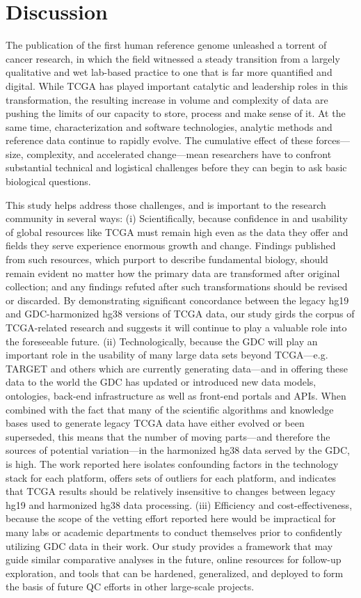 \section{Discussion}
The publication of the first human reference genome unleashed a torrent of cancer research, in which the field witnessed a steady transition from a largely qualitative and wet lab-based practice to one that is far more quantified and digital. While TCGA has played important catalytic and leadership roles in this transformation, the resulting increase in volume and complexity of data are pushing the limits of our capacity to store, process and make sense of it. At the same time, characterization and software technologies, analytic methods and reference data continue to rapidly evolve. The cumulative effect of these forces---size, complexity, and accelerated change---mean researchers have to confront substantial technical and logistical challenges before they can begin to ask basic biological questions.

This study helps address those challenges, and is important to the research community in several ways: (i) Scientifically, because confidence in and usability of global resources like TCGA must remain high even as the data they offer and fields they serve experience enormous growth and change. Findings published from such resources, which purport to describe fundamental biology, should remain evident no matter how the primary data are transformed after original collection; and any findings refuted after such transformations should be revised or discarded. By demonstrating significant concordance between the legacy hg19 and GDC-harmonized hg38 versions of TCGA data, our study girds the corpus of TCGA-related research and suggests it will continue to play a valuable role into the foreseeable future. (ii) Technologically, because the GDC will play an important role in the usability of many large data sets beyond TCGA---e.g. TARGET and others which are currently generating data---and in offering these data to the world the GDC has updated or introduced new data models, ontologies, back-end infrastructure as well as front-end portals and APIs. When combined with the fact that many of the scientific algorithms and knowledge bases used to generate legacy TCGA data have either evolved or been superseded, this means that the number of moving parts—and therefore the sources of potential variation—in the harmonized hg38 data served by the GDC, is high. The work reported here isolates confounding factors in the technology stack for each platform, offers sets of outliers for each platform, and indicates that TCGA results should be relatively insensitive to changes between legacy hg19 and harmonized hg38 data processing. (iii) Efficiency and cost-effectiveness, because the scope of the vetting effort reported here would be impractical for many labs or academic departments to conduct themselves prior to confidently utilizing GDC data in their work. Our study provides a framework that may guide similar comparative analyses in the future, online resources for follow-up exploration, and tools that can be hardened, generalized, and deployed to form the basis of future QC efforts in other large-scale projects.



